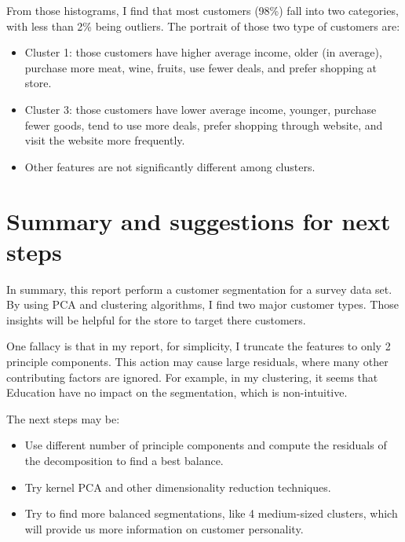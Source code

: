 \documentclass[11pt]{article}
\begin{document}
\begin{itemize}
\newpage

\end{itemize}

From those histograms, I find that most customers (98\%) fall into two categories, with less than 2\% being outliers.
The portrait of those two type of customers are:

\begin{itemize}
\item Cluster 1: those customers have higher average income, older (in average), purchase more meat, wine, fruits, use fewer deals, and prefer shopping at store.
\item Cluster 3: those customers have lower average income, younger, purchase fewer goods, tend to use more deals, prefer shopping through website, and visit the website more frequently.
\item Other features are not significantly different among clusters.
\end{itemize}

\section{Summary and suggestions for next steps}\label{section-sugg}
In summary, this report perform a customer segmentation for a survey data set. By using PCA and clustering algorithms, I find two major customer types. Those insights will be helpful for the store to target there customers.

One fallacy is that in my report, for simplicity, I truncate the features to only 2 principle components. This action may cause large residuals, where many other contributing factors are ignored. For example, in my clustering, it seems that Education have no impact on the segmentation, which is non-intuitive.

The next steps may be:
\begin{itemize}
\item Use different number of principle components and compute the residuals of the decomposition to find a best balance.
\item Try kernel PCA and other dimensionality reduction techniques.
\item Try to find more balanced segmentations, like 4 medium-sized clusters, which will provide us more information on customer personality.
\end{itemize}

%
\end{document}
